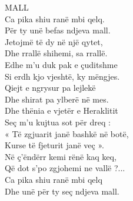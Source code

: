 \documentclass{article}
\begin{document}
MALL\\
Ca pika shiu ranë mbi qelq.\\
Për ty unë befas ndjeva mall.\\
Jetojmë të dy në një qytet,\\
Dhe rrallë shihemi, sa rrallë.\\


Edhe m'u duk pak e çuditshme\\
Si erdh kjo vjeshtë, ky mëngjes.\\
Qiejt e ngrysur pa lejlekë\\
Dhe shirat pa ylberë në mes.\\


Dhe thënia e vjetër e Heraklitit\\
Seç m'u kujtua sot për dreq :\\
« Të zgjuarit janë bashkë në botë,\\
Kurse të fjeturit janë veç ».\\

Në ç'ëndërr kemi rënë kaq keq,\\
Që dot s'po zgjohemi ne vallë ?...\\
Ca pika shiu ranë mbi qelq\\
Dhe unë për ty seç ndjeva mall.\\
\end{document}
